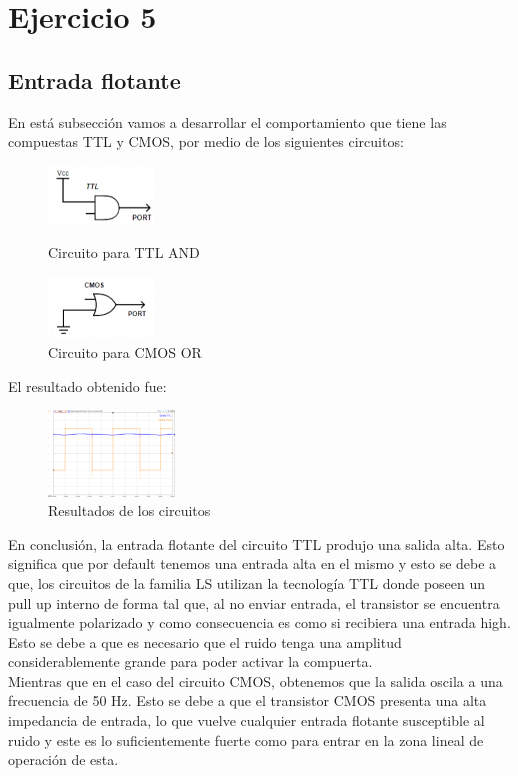 \section{Ejercicio 5}

\subsection{Entrada flotante}
En está subsección vamos a desarrollar el comportamiento que tiene las compuestas TTL y CMOS, por medio de los siguientes circuitos:

\begin{figure}[H]
	\centering
	\begin{minipage}{0.4\textwidth}
    		\centering
		\includegraphics[width=0.25\textwidth]{Ejercicio5/TTL.png}
		\caption{Circuito para TTL AND}
	\end{minipage}
	\hspace{5mm}
	\begin{minipage}{0.4\textwidth}
		\centering
		\includegraphics[width=0.25\textwidth]{Ejercicio5/CMOS.png}
		\caption{Circuito para CMOS OR}
	\end{minipage}
\end{figure}
El resultado obtenido fue:
\begin{figure}[H]
	\centering
	\includegraphics[width=0.3\textwidth]{Ejercicio5/Flotante.png}
	\caption{Resultados de los circuitos}
\end{figure}

En conclusión, la entrada flotante del circuito TTL produjo una salida alta. Esto significa que por default tenemos una entrada alta en el mismo y esto se debe a que, los circuitos de la familia LS utilizan la tecnología TTL donde poseen un pull up interno de forma tal que, al no enviar entrada, el transistor se encuentra igualmente polarizado y como consecuencia es como si recibiera una entrada high. Esto se debe a que es necesario que el ruido tenga una amplitud considerablemente grande para poder activar la compuerta.\\
Mientras que en el caso del circuito CMOS, obtenemos que la salida oscila a una frecuencia de 50 Hz. Esto se debe a que el transistor CMOS presenta una alta impedancia de entrada, lo que vuelve cualquier entrada flotante susceptible al ruido y este es lo suficientemente fuerte como para entrar en la zona lineal de operación de esta.

